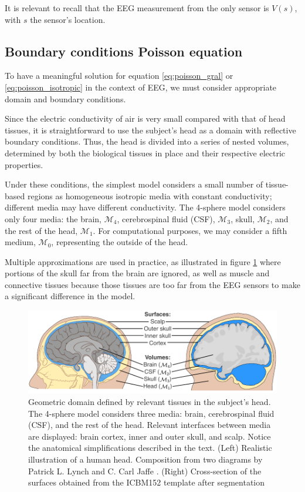 It is relevant to recall that the EEG measurement from the only sensor is $V(s)$, with $s$ the sensor's location.


\subsection{Boundary conditions Poisson equation}

To have a meaningful solution for equation \eqref{eq:poisson_gral} or \eqref{eq:poisson_isotropic} in the context of EEG, we must consider appropriate domain and boundary conditions.

Since the electric conductivity of air is very small compared with that of head tissues, it is straightforward to use the subject's head as a domain with reflective boundary conditions. 
%
Thus, the head is divided into a series of nested volumes, determined by both the biological tissues in place and their respective electric properties.

Under these conditions, the simplest model considers a small number of tissue-based regions as homogeneous isotropic media with constant conductivity; different media may have different conductivity.
%
The 4-sphere model considers only four media: the brain, $\mathcal{M}_4$, cerebrospinal fluid (CSF), $\mathcal{M}_3$, skull, $\mathcal{M}_2$, and the rest of the head, $\mathcal{M}_1$.
%
For computational purposes, we may consider a fifth medium, $\mathcal{M}_0$, representing the outside of the head.

Multiple approximations are used in practice, as illustrated in figure \ref{fig:diagrams2} where portions of the skull far from the brain are ignored, as well as muscle and connective tissues 
because those tissues are too far from the EEG sensors to make a significant difference in the model.

\begin{figure}
\centering
\includegraphics[width=\linewidth]{./img/HeadSurfacesVolumes}
\caption{Geometric domain defined by relevant tissues in the subject's head. The 4-sphere model considers three media: brain, cerebrospinal fluid (CSF), and the rest of the head. Relevant interfaces between media are displayed: brain cortex, inner and outer skull, and scalp. Notice the anatomical simplifications described in the text. (Left) Realistic illustration of a human head. Composition from two diagrams by Patrick L. Lynch and C. Carl Jaffe \cite{wikipic1, wikipic2}.  (Right) Cross-section of the surfaces obtained from the ICBM152 template after segmentation}
\label{fig:diagrams2}
\end{figure}

